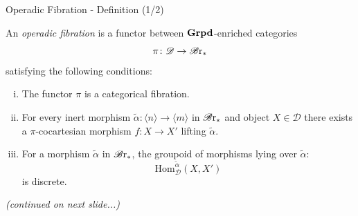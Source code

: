 
\begin{frame}{Operadic Fibration - Definition (1/2)}
    \small{\begin{defin}
        An {\em operadic fibration} is a functor between $\operatorname{\textbf{Grpd}}$-enriched
        categories
        \[
        \pi \colon \mathscr{D} \to \mathscr{B} \text{r}_{\ast}
        \]
        satisfying the following conditions:
        \begin{enumerate}[(i)]
            \item The functor $\pi$ is a categorical fibration.
            \item For every inert morphism $\widetilde{\alpha} \colon \langle n
            \rangle \to \langle m \rangle$ in $\mathscr{B} \text{r}_{\ast}$ and object $X \in
            \mathcal{D}$ there exists a $\pi$-cocartesian morphism $f \colon X
            \to X'$ lifting $\widetilde{\alpha}$.
            \item For a morphism $\widetilde{\alpha}$ in $\mathscr{B} \text{r}_{\ast}$,
            the groupoid of morphisms lying over $\widetilde{\alpha}$:
            $$\mathrm{Hom}_{\mathcal{D}}^{\widetilde{\alpha}}(X, X')$$ is
            discrete.
        \end{enumerate}
        \vspace{0.2cm}
        \textit{(continued on next slide...)}
    \end{defin}}
\end{frame}

